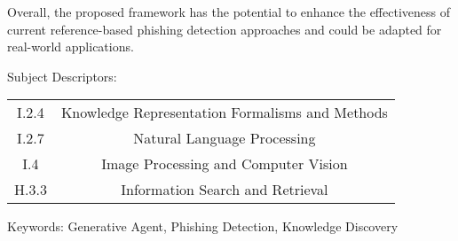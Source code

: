Overall, the proposed framework has the potential to enhance the effectiveness of current reference-based phishing detection approaches and could be adapted for real-world applications.


\vspace{2cm}
Subject Descriptors:

\begin{tabular}{c c}
I.2.4 & Knowledge Representation Formalisms and Methods \\
I.2.7 & Natural Language Processing \\
I.4 & Image Processing and Computer Vision \\
H.3.3 & Information Search and Retrieval\\
\end{tabular}

\vspace{2cm}
\noindent Keywords:
Generative Agent, Phishing Detection, Knowledge Discovery \\
\indent 

\pagebreak